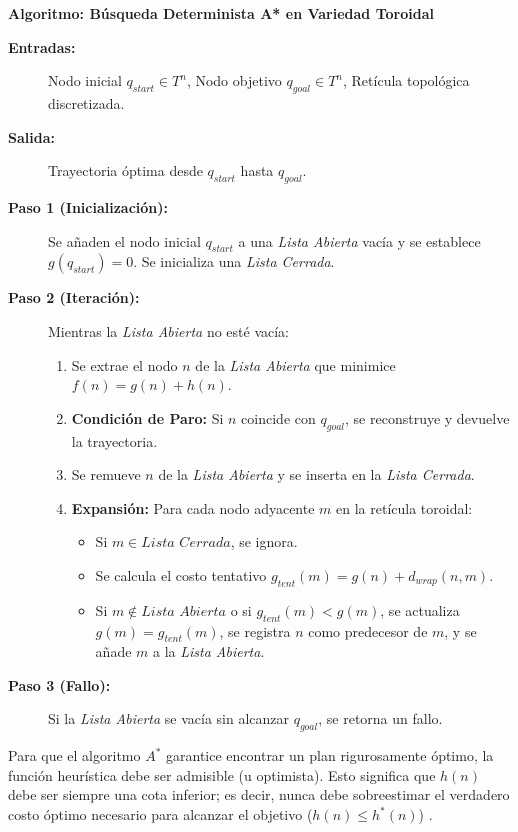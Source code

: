 \vspace{0.3cm}
\noindent\textbf{Algoritmo: Búsqueda Determinista A* en Variedad Toroidal}
\begin{description}
    \item[\textbf{Entradas:}] Nodo inicial $q_{start} \in T^n$, Nodo objetivo $q_{goal} \in T^n$, Retícula topológica discretizada.
    \item[\textbf{Salida:}] Trayectoria óptima desde $q_{start}$ hasta $q_{goal}$.
    
    \item[\textbf{Paso 1 (Inicialización):}] Se añaden el nodo inicial $q_{start}$ a una \textit{Lista Abierta} vacía y se establece $g(q_{start}) = 0$. Se inicializa una \textit{Lista Cerrada}.
    
    \item[\textbf{Paso 2 (Iteración):}] Mientras la \textit{Lista Abierta} no esté vacía:
    \begin{enumerate}
        \item Se extrae el nodo $n$ de la \textit{Lista Abierta} que minimice $f(n) = g(n) + h(n)$.
        \item \textbf{Condición de Paro:} Si $n$ coincide con $q_{goal}$, se reconstruye y devuelve la trayectoria.
        \item Se remueve $n$ de la \textit{Lista Abierta} y se inserta en la \textit{Lista Cerrada}.
        \item \textbf{Expansión:} Para cada nodo adyacente $m$ en la retícula toroidal:
        \begin{itemize}
            \item Si $m \in \textit{Lista Cerrada}$, se ignora.
            \item Se calcula el costo tentativo $g_{tent}(m) = g(n) + d_{wrap}(n, m)$.
            \item Si $m \notin \textit{Lista Abierta}$ o si $g_{tent}(m) < g(m)$, se actualiza $g(m) = g_{tent}(m)$, se registra $n$ como predecesor de $m$, y se añade $m$ a la \textit{Lista Abierta}.
        \end{itemize}
    \end{enumerate}
    
    \item[\textbf{Paso 3 (Fallo):}] Si la \textit{Lista Abierta} se vacía sin alcanzar $q_{goal}$, se retorna un fallo.
\end{description}
\vspace{0.3cm}

Para que el algoritmo $A^*$ garantice encontrar un plan rigurosamente óptimo, la función 
heurística debe ser admisible (u optimista). Esto significa que $h(n)$ debe ser siempre 
una cota inferior; es decir, nunca debe sobreestimar el verdadero costo óptimo necesario 
para alcanzar el objetivo ($h(n) \le h^*(n)$) \parencite{lavalle2006planning}. 

